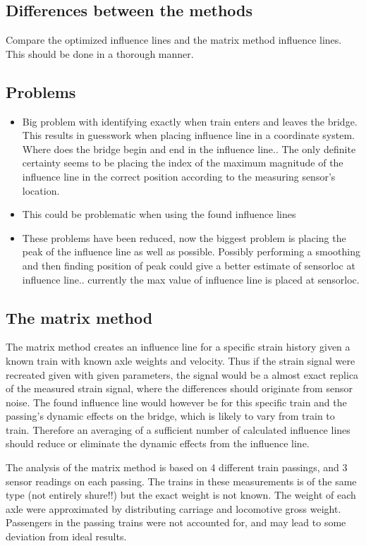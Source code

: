 \subsection{Differences between the methods}
Compare the optimized influence lines and the matrix method influence lines. This should be done in a thorough manner.
\subsection{Problems}
\begin{itemize}
\item Big problem with identifying exactly when train enters and leaves the bridge. This results in guesswork when placing influence line in a coordinate system. Where does the bridge begin and end in the influence line.. The only definite certainty seems to be placing the index of the maximum magnitude of the influence line in the correct position according to the measuring sensor's location.
\item This could be problematic when using the found influence lines
\item These problems have been reduced, now the biggest problem is placing the peak of the influence line as well as possible. Possibly performing a smoothing and then finding position of peak could give a better estimate of sensorloc at influence line.. currently the max value of influence line is placed at sensorloc.
\end{itemize}


\subsection{The matrix method}
The matrix method creates an influence line for a specific strain history given a known train with known axle weights and velocity. Thus if the strain signal were recreated given with given parameters, the signal would be a almost exact replica of the measured strain signal, where the differences should originate from sensor noise. The found influence line would however be for this specific train and the passing's dynamic effects on the bridge, which is likely to vary from train to train. Therefore an averaging of a sufficient number of calculated influence lines should reduce or eliminate the dynamic effects from the influence line.

The analysis of the matrix method is based on 4 different train passings, and 3 sensor readings on each passing. The trains in these measurements is of the same type (not entirely shure!!) but the exact weight is not known. The weight of each axle were approximated by distributing carriage and locomotive gross weight. Passengers in the passing trains were not accounted for, and may lead to some deviation from ideal results.

